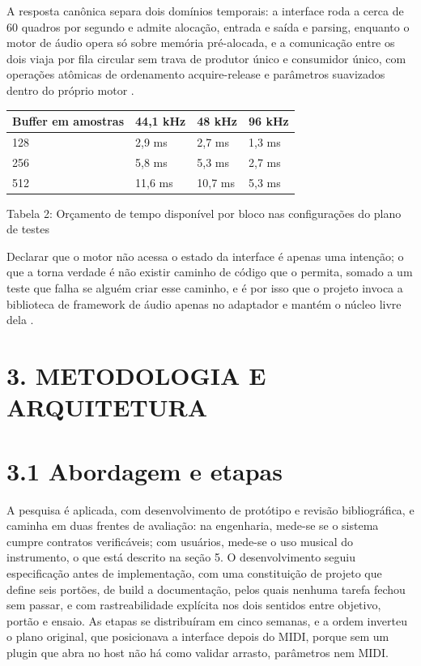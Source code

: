 \documentclass[11pt,a4paper]{article}
\begin{document}
A resposta canônica separa dois domínios temporais: a interface roda a cerca de 60 quadros por segundo e admite alocação, entrada e saída e parsing, enquanto o motor de áudio opera só sobre memória pré-alocada, e a comunicação entre os dois viaja por fila circular sem trava de produtor único e consumidor único, com operações atômicas de ordenamento acquire-release e parâmetros suavizados dentro do próprio motor \cite{pirkle2019}.


\begin{center}
\scriptsize
\setlength{\tabcolsep}{4pt}
\begin{tabular}{p{}|p{}|p{}|p{}}
\hline
\textbf{Buffer em amostras} & \textbf{44,1 kHz} & \textbf{48 kHz} & \textbf{96 kHz} \\
\hline
128 & 2,9 ms & 2,7 ms & 1,3 ms \\
256 & 5,8 ms & 5,3 ms & 2,7 ms \\
512 & 11,6 ms & 10,7 ms & 5,3 ms \\
\hline
\end{tabular}
\end{center}
\noindent Tabela 2: Orçamento de tempo disponível por bloco nas configurações do plano de testes\par
\label{tab:2}
\vspace{2pt}{\footnotesize\noindent Autores\par}

Declarar que o motor não acessa o estado da interface é apenas uma intenção; o que a torna verdade é não existir caminho de código que o permita, somado a um teste que falha se alguém criar esse caminho, e é por isso que o projeto invoca a biblioteca de framework de áudio apenas no adaptador e mantém o núcleo livre dela \cite{juce2026}.


\section*{3. METODOLOGIA E ARQUITETURA}

\section*{3.1 Abordagem e etapas}

A pesquisa é aplicada, com desenvolvimento de protótipo e revisão bibliográfica, e caminha em duas frentes de avaliação: na engenharia, mede-se se o sistema cumpre contratos verificáveis; com usuários, mede-se o uso musical do instrumento, o que está descrito na seção 5. O desenvolvimento seguiu especificação antes de implementação, com uma constituição de projeto que define seis portões, de build a documentação, pelos quais nenhuma tarefa fechou sem passar, e com rastreabilidade explícita nos dois sentidos entre objetivo, portão e ensaio. As etapas se distribuíram em cinco semanas, e a ordem inverteu o plano original, que posicionava a interface depois do MIDI, porque sem um plugin que abra no host não há como validar arrasto, parâmetros nem MIDI.
\end{document}

